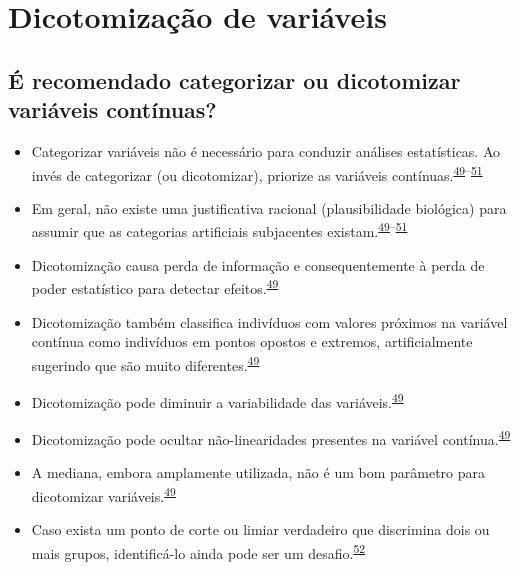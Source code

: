 \documentclass[
]{book}
\begin{document}
\hypertarget{dicotomizacao}{%
\section{Dicotomização de variáveis}\label{dicotomizacao}}

\hypertarget{uxe9-recomendado-categorizar-ou-dicotomizar-variuxe1veis-contuxednuas}{%
\subsection{É recomendado categorizar ou dicotomizar variáveis contínuas?}\label{uxe9-recomendado-categorizar-ou-dicotomizar-variuxe1veis-contuxednuas}}

\begin{itemize}
\item
  Categorizar variáveis não é necessário para conduzir análises estatísticas. Ao invés de categorizar (ou dicotomizar), priorize as variáveis contínuas.\textsuperscript{\protect\hyperlink{ref-Altman2006}{49}--\protect\hyperlink{ref-Collins2016}{51}}
\item
  Em geral, não existe uma justificativa racional (plausibilidade biológica) para assumir que as categorias artificiais subjacentes existam.\textsuperscript{\protect\hyperlink{ref-Altman2006}{49}--\protect\hyperlink{ref-Collins2016}{51}}
\item
  Dicotomização causa perda de informação e consequentemente à perda de poder estatístico para detectar efeitos.\textsuperscript{\protect\hyperlink{ref-Altman2006}{49}}
\item
  Dicotomização também classifica indivíduos com valores próximos na variável contínua como indivíduos em pontos opostos e extremos, artificialmente sugerindo que são muito diferentes.\textsuperscript{\protect\hyperlink{ref-Altman2006}{49}}
\item
  Dicotomização pode diminuir a variabilidade das variáveis.\textsuperscript{\protect\hyperlink{ref-Altman2006}{49}}
\item
  Dicotomização pode ocultar não-linearidades presentes na variável contínua.\textsuperscript{\protect\hyperlink{ref-Altman2006}{49}}
\item
  A mediana, embora amplamente utilizada, não é um bom parâmetro para dicotomizar variáveis.\textsuperscript{\protect\hyperlink{ref-Altman2006}{49}}
\item
  Caso exista um ponto de corte ou limiar verdadeiro que discrimina dois ou mais grupos, identificá-lo ainda pode ser um desafio.\textsuperscript{\protect\hyperlink{ref-Prince2017}{52}}
\end{itemize}
\end{document}

